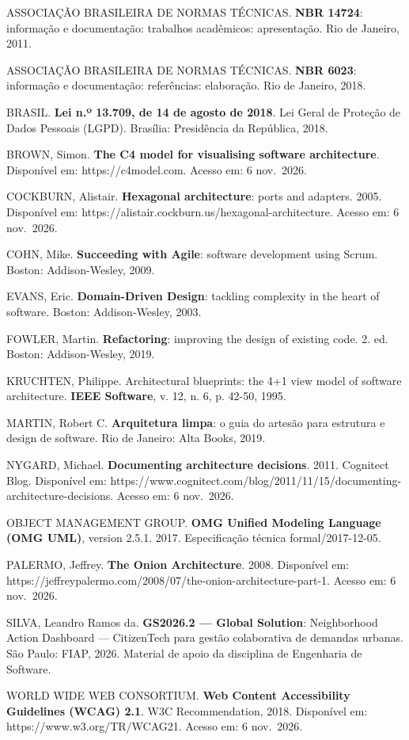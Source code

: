 \documentclass[12pt,a4paper,oneside]{article}
\begin{document}
{\singlespacing\raggedright
\setlength{\parindent}{0pt}
\setlength{\parskip}{0.7\baselineskip}

ASSOCIAÇÃO BRASILEIRA DE NORMAS TÉCNICAS. \textbf{NBR 14724}: informação e
documentação: trabalhos acadêmicos: apresentação. Rio de Janeiro, 2011.

ASSOCIAÇÃO BRASILEIRA DE NORMAS TÉCNICAS. \textbf{NBR 6023}: informação e
documentação: referências: elaboração. Rio de Janeiro, 2018.

BRASIL. \textbf{Lei n.º 13.709, de 14 de agosto de 2018}. Lei Geral de Proteção
de Dados Pessoais (LGPD). Brasília: Presidência da República, 2018.

BROWN, Simon. \textbf{The C4 model for visualising software architecture}.
Disponível em: https://c4model.com. Acesso em: 6 nov.\ 2026.

COCKBURN, Alistair. \textbf{Hexagonal architecture}: ports and adapters. 2005.
Disponível em: https://alistair.cockburn.us/hexagonal-architecture. Acesso em:
6 nov.\ 2026.

COHN, Mike. \textbf{Succeeding with Agile}: software development using Scrum.
Boston: Addison-Wesley, 2009.

EVANS, Eric. \textbf{Domain-Driven Design}: tackling complexity in the heart of
software. Boston: Addison-Wesley, 2003.

FOWLER, Martin. \textbf{Refactoring}: improving the design of existing code.
2. ed. Boston: Addison-Wesley, 2019.

KRUCHTEN, Philippe. Architectural blueprints: the 4+1 view model of software
architecture. \textbf{IEEE Software}, v. 12, n. 6, p. 42-50, 1995.

MARTIN, Robert C. \textbf{Arquitetura limpa}: o guia do artesão para estrutura e
design de software. Rio de Janeiro: Alta Books, 2019.

NYGARD, Michael. \textbf{Documenting architecture decisions}. 2011. Cognitect
Blog. Disponível em:
https://www.cognitect.com/blog/2011/11/15/documenting-architecture-decisions.
Acesso em: 6 nov.\ 2026.

OBJECT MANAGEMENT GROUP. \textbf{OMG Unified Modeling Language (OMG UML)},
version 2.5.1. 2017. Especificação técnica formal/2017-12-05.

PALERMO, Jeffrey. \textbf{The Onion Architecture}. 2008. Disponível em:
https://jeffreypalermo.com/2008/07/the-onion-architecture-part-1. Acesso em:
6 nov.\ 2026.

SILVA, Leandro Ramos da. \textbf{GS2026.2 — Global Solution}: Neighborhood
Action Dashboard — CitizenTech para gestão colaborativa de demandas urbanas. São
Paulo: FIAP, 2026. Material de apoio da disciplina de Engenharia de Software.

WORLD WIDE WEB CONSORTIUM. \textbf{Web Content Accessibility Guidelines (WCAG)
2.1}. W3C Recommendation, 2018. Disponível em: https://www.w3.org/TR/WCAG21.
Acesso em: 6 nov.\ 2026.

}
\end{document}
